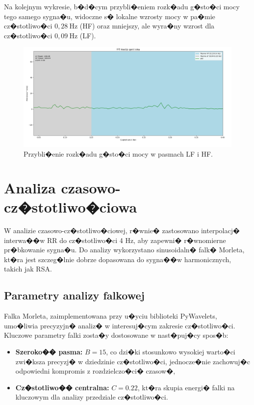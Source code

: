 Na kolejnym wykresie, b�d�cym przybli�eniem rozk�adu g�sto�ci mocy tego samego
sygna�u, widoczne s� lokalne wzrosty mocy w pa�mie cz�stotliwo�ci \(0,28\
\text{Hz}\) (HF) oraz mniejszy, ale wyra�ny wzrost dla cz�stotliwo�ci \(0,09\
\text{Hz}\) (LF).
\begin{figure}
    \centering
    \includegraphics[scale=0.25]{Rysunki/fftCLOSE.png}
    \caption{Przybli�enie rozk�adu g�sto�ci mocy w pasmach LF i HF.}
    \label{fig:fft_zoomed}
\end{figure}

\section{Analiza czasowo-cz�stotliwo�ciowa}

W analizie czasowo-cz�stotliwo�ciowej, r�wnie� zastosowano interpolacj�
interwa��w RR do cz�stotliwo�ci 4 Hz, aby zapewni� r�wnomierne pr�bkowanie
sygna�u. Do analizy wykorzystano sinusoidaln� falk� Morleta, kt�ra jest
szczeg�lnie dobrze dopasowana do sygna��w harmonicznych, takich jak RSA.

\subsection{Parametry analizy falkowej}
Falka Morleta, zaimplementowana przy u�yciu biblioteki PyWavelets, umo�liwia
precyzyjn� analiz� w interesuj�cym zakresie cz�stotliwo�ci. Kluczowe parametry
falki zosta�y dostosowane w nast�puj�cy spos�b:
\begin{itemize}
    \item \textbf{Szeroko�� pasma:} \(B = 15\), co dzi�ki stosunkowo wysokiej warto�ci zwi�ksza precyzj� w dziedzinie cz�stotliwo�ci, jednocze�nie zachowuj�c odpowiedni kompromis z rozdzielczo�ci� czasow�,
    \item \textbf{Cz�stotliwo�� centralna:} \(C = 0.22\), kt�ra skupia energi� falki na kluczowym dla analizy przedziale cz�stotliwo�ci.
\end{itemize}


